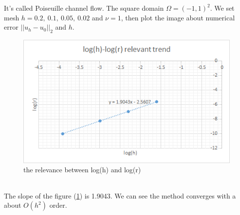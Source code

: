 \documentclass[a4paper]{article}
\begin{document}
It's called Poiseuille channel flow. The square domain $\Omega = (-1,1)^2$. We set mesh $h=0.2,\ 0.1,\ 0.05,\ 0.02$ and $\nu=1$, then plot the image about numerical error $||u_h-u_0||_2$ and $h$.
\begin{figure}[h]
\centering
\includegraphics[scale = 0.8]{images/convergence.png}
\caption{the relevance between log(h) and log(r)}
\label{im::log(h)-res}
\end{figure}
\\
The slope of the figure (\ref{im::log(h)-res}) is 1.9043. We can see the method converges with a about $O(h^2)$ order. \\
\end{document}
